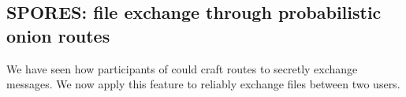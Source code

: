 








\subsection{SPORES: file exchange through probabilistic onion routes}
\label{ssec:spores_file_exchange_through_probabilistic_onion_routes}


We have seen how participants of \name could craft routes to secretly exchange messages.
We now apply this feature to reliably exchange files between two users.

